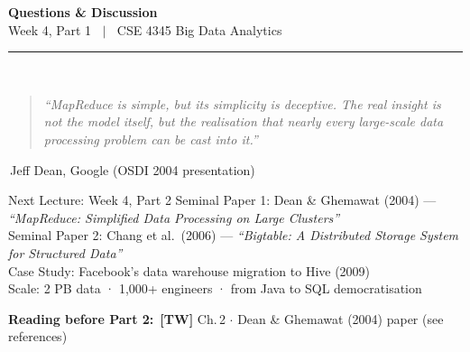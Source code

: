 \documentclass[aspectratio=169,10pt]{beamer}
\begin{document}
\begin{frame}[c]
  \begin{center}
    {\Large\bfseries Questions \& Discussion}\\[10pt]
    {\large Week 4, Part 1 $\;\mid\;$ CSE 4345 Big Data Analytics}\\[8pt]
    \textcolor{PUGray}{\rule{7cm}{0.5pt}}\\[10pt]
    \begin{quote}
      \itshape ``MapReduce is simple, but its simplicity is deceptive.  The real insight is not the model itself, but the realisation that nearly every large-scale data processing problem can be cast into it.''
    \end{quote}
    \hfill\textemdash\,Jeff Dean, Google (OSDI 2004 presentation)
    \vspace{12pt}
    \begin{block}{\centering Next Lecture: Week 4, Part 2}
      \centering
      Seminal Paper 1: Dean \& Ghemawat (2004) — \textit{``MapReduce: Simplified Data Processing on Large Clusters''}\\[4pt]
      Seminal Paper 2: Chang et al.\ (2006) — \textit{``Bigtable: A Distributed Storage System for Structured Data''}\\[4pt]
      \small Case Study: Facebook's data warehouse migration to Hive (2009) \\
      Scale: 2 PB data · 1{,}000+ engineers · from Java to SQL democratisation
    \end{block}
    \vspace{6pt}
    \textbf{Reading before Part 2:}\ \textbf{[TW]} Ch.\,2 $\cdot$ Dean \& Ghemawat (2004) paper (see references)
  \end{center}
\end{frame}

\end{document}
